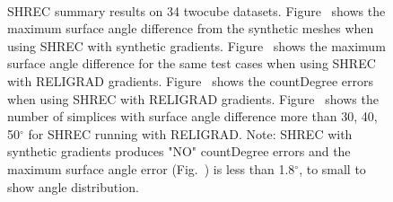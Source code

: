 \begin{figure}
	\centering	
	\quad
	\\
	\quad
	\caption{SHREC summary results on 34 twocube datasets. Figure~\protect{} shows the maximum surface angle difference from the synthetic meshes when using SHREC with synthetic gradients. Figure~\protect{} shows the maximum surface angle difference for the same test cases when using SHREC with RELIGRAD gradients. Figure~\protect{} shows the countDegree errors when using SHREC with RELIGRAD gradients. 
	Figure~\protect{} shows the number of simplices with surface angle difference more than 30, 40, 50$^{\circ}$ for SHREC running with RELIGRAD. 
	 Note: SHREC with synthetic gradients produces "NO" countDegree errors and the maximum surface angle error (Fig.~\protect{}) is less than 1.8$^{\circ}$, to small to show angle distribution. }
	\label{fig:shrecTwoCube}
\end{figure}


